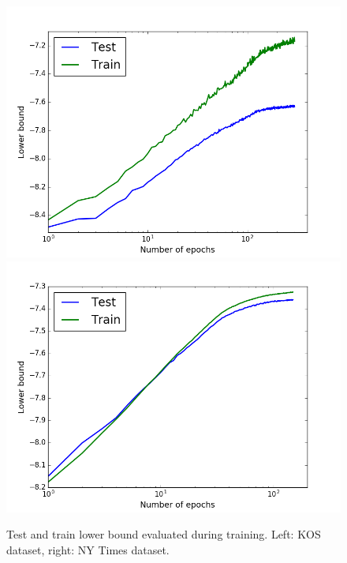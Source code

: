 \documentclass{report}
\begin{document}
	\begin{figure}
		\includegraphics[scale = 0.40]{img/kos_400_0_lb.png}
		\includegraphics[scale = 0.40]{img/ny_400_50_lb.png}
		\caption{Test and train lower bound evaluated during training. Left: KOS dataset, right: NY Times dataset.}
		\label{lb_first}
	\end{figure}
	
\end{document}
